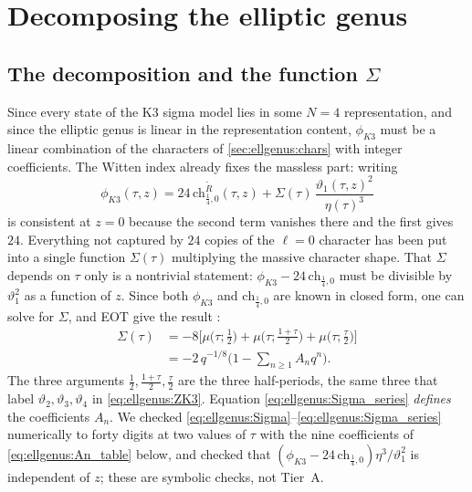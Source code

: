 \section{Decomposing the elliptic genus}\label{sec:ellgenus:decomp}

\subsection{The decomposition and the function \texorpdfstring{$\Sigma$}{Sigma}}

Since every state of the K3 sigma model lies in some $N=4$ representation, and since the
elliptic genus is linear in the representation content, $\phi_{K3}$ must be a linear
combination of the characters of \cref{sec:ellgenus:chars} with integer coefficients. The
Witten index already fixes the massless part: writing
\begin{equation}\label{eq:ellgenus:decomp1}
 \phi_{K3}(\tau,z)=24\,\mathrm{ch}^{\tilde R}_{\frac14,0}(\tau,z)
 +\Sigma(\tau)\,\frac{\vartheta_1(\tau,z)^2}{\eta(\tau)^3}
\end{equation}
 is consistent at $z=0$ because the second term
vanishes there and the first gives $24$. Everything not captured by $24$ copies of the
$\ell=0$ character has been put into a single function $\Sigma(\tau)$ multiplying the
massive character shape. That $\Sigma$ depends on $\tau$ only is a nontrivial statement:
$\phi_{K3}-24\,\mathrm{ch}_{\frac14,0}$ must be divisible by $\vartheta_1^2$ as a function
of $z$. Since both $\phi_{K3}$ and $\mathrm{ch}_{\frac14,0}$ are known in closed form, one can
solve for $\Sigma$, and EOT give the result :
\begin{align}
 \Sigma(\tau)&=-8\Big[\mu\big(\tau;\tfrac12\big)+\mu\big(\tau;\tfrac{1+\tau}2\big)
   +\mu\big(\tau;\tfrac\tau2\big)\Big]\label{eq:ellgenus:Sigma}\\
 &=-2\,q^{-1/8}\Big(1-\sum_{n\ge1}A_nq^n\Big).\label{eq:ellgenus:Sigma_series}
\end{align}
The three arguments $\tfrac12,\tfrac{1+\tau}2,\tfrac\tau2$ are the three half-periods, the
same three that label $\vartheta_2,\vartheta_3,\vartheta_4$ in \eqref{eq:ellgenus:ZK3}.
Equation \eqref{eq:ellgenus:Sigma_series} \emph{defines} the coefficients $A_n$. We checked
\eqref{eq:ellgenus:Sigma}--\eqref{eq:ellgenus:Sigma_series} numerically to forty digits at two
values of $\tau$ with the nine coefficients of \eqref{eq:ellgenus:An_table} below, and checked
that $(\phi_{K3}-24\,\mathrm{ch}_{\frac14,0})\eta^3/\vartheta_1^2$ is independent of $z$; these
are symbolic checks, not Tier~A.

